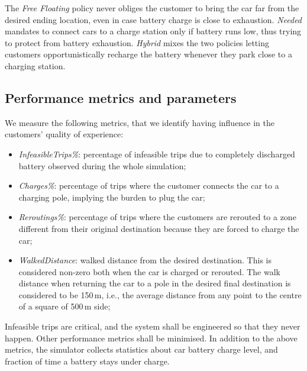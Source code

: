 The \textit{Free Floating} policy never obliges the customer to bring the car far from the desired ending location, even in case battery charge is close to exhaustion. \textit{Needed} mandates to connect cars to a charge station only if battery runs low, thus trying to protect from battery exhaustion. \textit{Hybrid} mixes the two policies letting customers opportunistically recharge the battery whenever they park close to a charging station.


\subsection{Performance metrics and parameters}
\label{sec:metrics}

We measure the following metrics, that we identify having influence in the customers' quality of experience:
\begin{itemize}
	\item \textit{InfeasibleTrips\%}: percentage of infeasible trips due to completely discharged battery observed during the whole simulation;  
	\item \textit{Charges\%}: percentage of trips where the customer connects the car to a charging pole, implying the burden to plug the car;
	\item \textit{Reroutings\%}: percentage of trips where the customers are rerouted to a zone different from their original destination because they are forced to charge the car;
	\item \textit{WalkedDistance}: walked distance from the desired destination. This is considered non-zero both when the car is charged or rerouted. The walk distance when returning the car to a pole in the desired final destination is considered to be 150\,m, i.e., the average distance from any point to the centre of a square of  500\,m side;
\end{itemize}

Infeasible trips are critical, and the system shall be engineered so that they never happen. Other performance metrics shall be minimised. 
In addition to the above metrics, the simulator collects statistics about car battery charge level, and fraction of time a battery stays under charge. 
  
